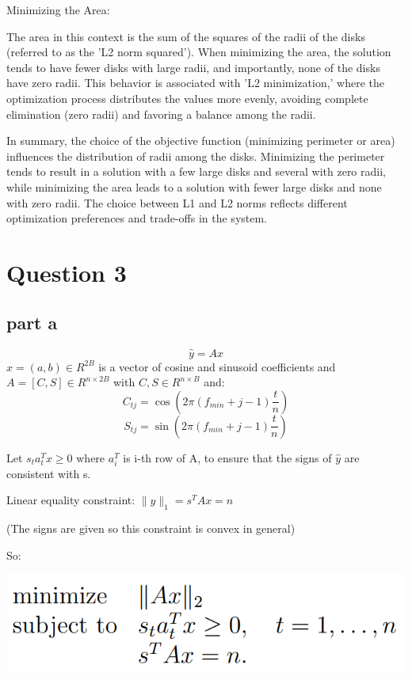 \documentclass{uofa-eng-assignment}
\begin{document}
Minimizing the Area:

The area in this context is the sum of the squares of the radii of the disks (referred to as the 'L2 norm squared').
When minimizing the area, the solution tends to have fewer disks with large radii, and importantly, none of the disks have zero radii.
This behavior is associated with 'L2 minimization,' where the optimization process distributes the values more evenly, avoiding complete elimination (zero radii) and favoring a balance among the radii.

In summary, the choice of the objective function (minimizing perimeter or area) influences the distribution of radii among the disks. Minimizing the perimeter tends to result in a solution with a few large disks and several with zero radii, while minimizing the area leads to a solution with fewer large disks and none with zero radii. The choice between L1 and L2 norms reflects different optimization preferences and trade-offs in the system.

\section*{Question 3}

\subsection*{part a}

\[
\hat{y} = Ax
\]
$x = (a, b)\in R^{2B}$ is a vector of
cosine and sinusoid coefficients and $A = [C, S] \in R^{n\times2B}$ with $C,S \in R^{n\times B}$ and:
\[
C_{tj} = \cos(2\pi(f_{min}+j-1)\frac{t}{n})
\]
\[
S_{tj} = \sin(2\pi(f_{min}+j-1)\frac{t}{n})
\]

Let $s_ta_t^Tx\ge0$  where $a_i^T$ is i-th row of A, to ensure that the signs of $\hat{y}$ are consistent with s.

Linear equality constraint:
$\lVert \hat{y} \rVert_1 = s^TAx = n$

(The signs are given so this constraint is convex in general)

So:

\begin{center}
	\includegraphics[width=0.4\linewidth]{screenshot008}
\end{center}
\end{document}

